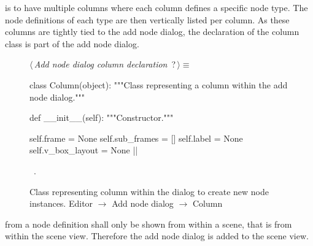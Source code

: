 \documentclass[%
    a4paper,    %
    justified,  %
    nobib,      %
    openany     %
]{tufte-book}
\makeatletter
\renewcommand{\label}[1]{\@tufte@label{##1}}%
\makeatother
\begin{document}
 is to have multiple columns
where each column defines a specific node type. The node definitions of each
type are then vertically listed per column. As these columns are tightly tied to
the add node dialog, the declaration of the column class is part of the add node
dialog.

\begin{figure}
\begin{flushleft} \small
\begin{minipage}{\linewidth}\label{scrap149}\raggedright\small
{} $\langle\,${\itshape Add node dialog column declaration}\nobreak\ {\footnotesize {?}}$\,\rangle\equiv$
\vspace{-1ex}
\begin{pythoncode}
class Column(object):
    """Class representing a column within the add node dialog."""

    def __init__(self):
        """Constructor."""

        self.frame         = None
        self.sub_frames    = []
        self.label         = None
        self.v_box_layout  = None
|\NWsep|
\end{pythoncode}
\vspace{1.5ex}
\footnotesize
\begin{list}{}{\setlength{\itemsep}{-\parsep}\setlength{\itemindent}{-\leftmargin}}
\item \NWtxtMacroRefIn\ .

\item{}
\end{list}
\end{minipage}\vspace{4ex}
\end{flushleft}
\caption{Class representing column within the dialog to create new node
  instances.
  \newline{}\newline{}Editor $\rightarrow$ Add node dialog $\rightarrow$ Column}
\label{editor:lst:add-node-dialog:column}
\end{figure}


 from a node definition shall
only be shown from within a scene, that is from within the scene view. Therefore
the add node dialog is added to the scene view.
\end{document}

